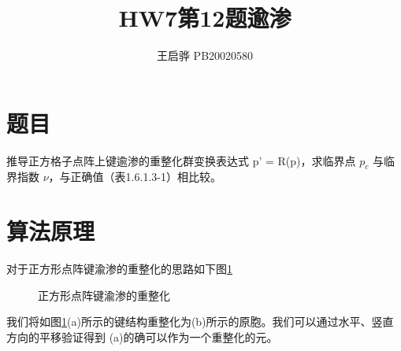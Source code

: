 \documentclass{article}
\title{\songti \zihao{2}\bfseries HW7第12题逾渗}
\author{王启骅 PB20020580}
\begin{document}
	\maketitle
	\section{题目}
	推导正方格子点阵上键逾渗的重整化群变换表达式 p’ = R(p)，求临界点 $ p_c $
	与临
	界指数 $ \nu $，与正确值（表1.6.1.3-1）相比较。
	
	\section{算法原理}
	对于正方形点阵键渝渗的重整化的思路如下图\ref{fig:1}
	\begin{figure}[!h]
		\centering
		\caption{\heiti{}正方形点阵键渝渗的重整化}
		\label{fig:1}
	\end{figure}
我们将如图\ref{fig:1}(a)所示的键结构重整化为(b)所示的原胞。我们可以通过水平、竖直方向的平移验证得到 (a)的确可以作为一个重整化的元。
\end{document}
